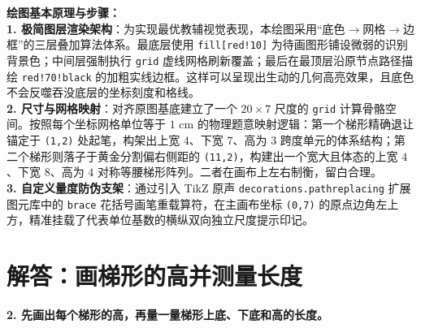\vspace{0.6cm}

{\small\color{blue!70!black}
\textbf{绘图基本原理与步骤：}\\
\textbf{1. 极简图层渲染架构}：为实现最优教辅视觉表现，本绘图采用“底色$\to$网格$\to$边框”的三层叠加算法体系。最底层使用 \texttt{fill[red!10]} 为待画图形铺设微弱的识别背景色；中间层强制执行 \texttt{grid} 虚线网格刷新覆盖；最后在最顶层沿原节点路径描绘 \texttt{red!70!black} 的加粗实线边框。这样可以呈现出生动的几何高亮效果，且底色不会反噬吞没底层的坐标刻度和格线。\\
\textbf{2. 尺寸与网格映射}：对齐原图基底建立了一个 $20 \times 7$ 尺度的 \texttt{grid} 计算骨骼空间。按照每个坐标网格单位等于 $1\text{ cm}$ 的物理题意映射逻辑：第一个梯形精确退让锚定于 \texttt{(1,2)} 处起笔，构架出上宽 $4$、下宽 $7$、高为 $3$ 跨度单元的体系结构；第二个梯形则落子于黄金分割偏右侧距的 \texttt{(11,2)}，构建出一个宽大且体态的上宽 $4$、下宽 $8$、高为 $4$ 对称等腰梯形阵列。二者在画布上左右制衡，留白合理。\\
\textbf{3. 自定义量度防伪支架}：通过引入 TikZ 原声 \texttt{decorations.pathreplacing} 扩展图元库中的 \texttt{brace} 花括号画笔重载算符，在主画布坐标 \texttt{(0,7)} 的原点边角左上方，精准挂载了代表单位基数的横纵双向独立尺度提示印记。
}


\newpage



\section{解答：画梯形的高并测量长度}

\vspace{0.4cm}

\noindent\textbf{2. 先画出每个梯形的高，再量一量梯形上底、下底和高的长度。}

\vspace{0.8cm}

